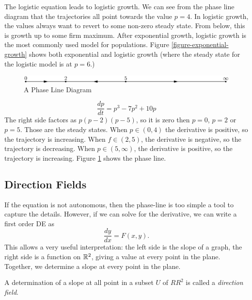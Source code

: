 \documentclass[fleqn,letterpaper]{report}
\begin{document}
The logistic equation leads to logistic growth. We can see
from the phase line diagram that the trajectories all point
towards the value $p=4$. In logistic growth, the values
always want to revert to some non-zero steady state. From
below, this is growth up to some firm maximum. After
exponential growth, logistic growth is the most commonly used
model for populations. Figure \ref{figure-exponential-growth} shows
both exponential and logistic growth (where the steady state for the
logistic model is at $p=6$.)

\begin{figure}[t]
\centering
\includegraphics[width=12cm]{figure05.eps}
\caption{A Phase Line Diagram}
\label{figure-phase-line2}
\end{figure}

\begin{example}
\begin{equation*}
\frac{dp}{dt} = p^3 -7p^2 + 10p
\end{equation*}
The right side factors as $p(p-2)(p-5)$, so it is zero then
$p=0$, $p=2$ or $p=5$. Those are the
steady states. When $p \in (0,4)$ the derivative is positive,
so the trajectory is increasing. When $f \in (2,5)$, the
derivative is negative, so the trajectory is decreasing. When
$p \in (5,\infty)$, the derivative is positive, so the
trajectory is increasing. Figure \ref{figure-phase-line2}
shows the phase line.
\end{example}

\subsection{Direction Fields}
\label{direction-fields}

If the equation is not autonomous, then the phase-line is too
simple a tool to capture the details. However, if we can
solve for the derivative, we can write a first order DE as
\begin{equation*}
\frac{dy}{dx} = F(x,y).
\end{equation*}
This allows a very useful interpretation: the left side is the
slope of a graph, the right side is a function on $\mathbb{R}^2$,
giving a value at every point in the plane. Together, we
determine a slope at every point in the plane. 

\begin{defn}
A determination of a slope at all point in a subset $U$ of
$RR^2$ is called a \emph{direction field}.
\end{defn}
\end{document}
